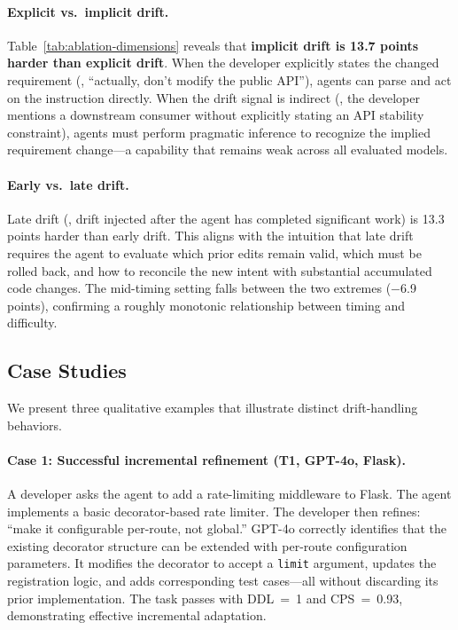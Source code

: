 \paragraph{Explicit vs.\ implicit drift.}
Table~\ref{tab:ablation-dimensions} reveals that \textbf{implicit drift is 13.7 points harder than explicit drift}. When the developer explicitly states the changed requirement (\eg, ``actually, don't modify the public API''), agents can parse and act on the instruction directly. When the drift signal is indirect (\eg, the developer mentions a downstream consumer without explicitly stating an API stability constraint), agents must perform pragmatic inference to recognize the implied requirement change---a capability that remains weak across all evaluated models.

\paragraph{Early vs.\ late drift.}
Late drift (\ie, drift injected after the agent has completed significant work) is 13.3 points harder than early drift. This aligns with the intuition that late drift requires the agent to evaluate which prior edits remain valid, which must be rolled back, and how to reconcile the new intent with substantial accumulated code changes. The mid-timing setting falls between the two extremes ($-$6.9 points), confirming a roughly monotonic relationship between timing and difficulty.

\subsection{Case Studies}
\label{sec:case-studies}

We present three qualitative examples that illustrate distinct drift-handling behaviors.

\paragraph{Case 1: Successful incremental refinement (T1, GPT-4o, Flask).}
A developer asks the agent to add a rate-limiting middleware to Flask. The agent implements a basic decorator-based rate limiter. The developer then refines: ``make it configurable per-route, not global.'' GPT-4o correctly identifies that the existing decorator structure can be extended with per-route configuration parameters. It modifies the decorator to accept a \texttt{limit} argument, updates the registration logic, and adds corresponding test cases---all without discarding its prior implementation. The task passes with DDL~=~1 and CPS~=~0.93, demonstrating effective incremental adaptation.

